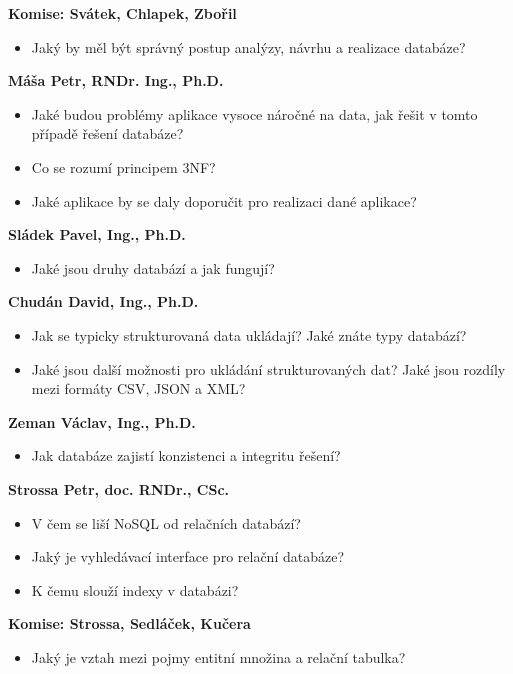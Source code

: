 \documentclass[12pt,a4paper]{article}
\begin{document}
\begin{profesorbox}
\textbf{Komise: Svátek, Chlapek, Zbořil}
\begin{itemize}
  \item Jaký by měl být správný postup analýzy, návrhu a realizace databáze?
\end{itemize}

\textbf{Máša Petr, RNDr. Ing., Ph.D.}
\begin{itemize}
  \item Jaké budou problémy aplikace vysoce náročné na data, jak řešit v tomto případě řešení databáze?
  \item Co se rozumí principem 3NF?
  \item Jaké aplikace by se daly doporučit pro realizaci dané aplikace?
\end{itemize}

\textbf{Sládek Pavel, Ing., Ph.D.}
\begin{itemize}
  \item Jaké jsou druhy databází a jak fungují?
\end{itemize}

\textbf{Chudán David, Ing., Ph.D.}
\begin{itemize}
  \item Jak se typicky strukturovaná data ukládají? Jaké znáte typy databází?
  \item Jaké jsou další možnosti pro ukládání strukturovaných dat? Jaké jsou rozdíly mezi formáty CSV,
    JSON a XML?
\end{itemize}

\textbf{Zeman Václav, Ing., Ph.D.}
\begin{itemize}
  \item Jak databáze zajistí konzistenci a integritu řešení?
\end{itemize}

\textbf{Strossa Petr, doc. RNDr., CSc.}
\begin{itemize}
  \item V čem se liší NoSQL od relačních databází?
  \item Jaký je vyhledávací interface pro relační databáze?
  \item K čemu slouží indexy v databázi?
\end{itemize}

\textbf{Komise: Strossa, Sedláček, Kučera}
\begin{itemize}
  \item Jaký je vztah mezi pojmy entitní množina a relační tabulka?
\end{itemize}


\end{profesorbox}
\end{document}
